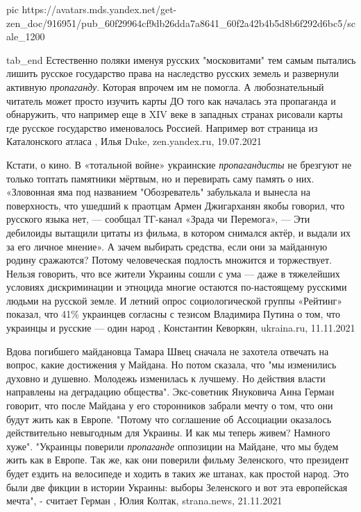     pic https://avatars.mds.yandex.net/get-zen_doc/916951/pub_60f29964cf9db26dda7a8641_60f2a42b4b5d8b6f292d6bc5/scale_1200

  tab_end
\fi
Естественно поляки именуя русских "московитами" тем самым пытались лишить
русское государство права на наследство русских земель и развернули активную
\emph{пропаганду}. Которая впрочем им не помогла.  А любознательный читатель
может просто изучить карты ДО того как началась эта пропаганда и обнаружить,
что например еще в XIV веке в западных странах рисовали карты где русское
государство именовалось Россией. Например вот страница из Каталонского атласа
, Илья Duke, zen.yandex.ru, 19.07.2021

Кстати, о кино. В «тотальной войне» украинские \emph{пропагандисты} не брезгуют
не только топтать памятники мёртвым, но и перевирать саму память о них.
«Зловонная яма под названием "Обозреватель" забулькала и вынесла на
поверхность, что ушедший к праотцам Армен Джигарханян якобы говорил, что
русского языка нет, — сообщал ТГ-канал «Зрада чи Перемога», — Эти дебилоиды
вытащили цитаты из фильма, в котором снимался актёр, и выдали их за его личное
мнение». А зачем выбирать средства, если они за майданную родину сражаются?
Потому человеческая подлость множится и торжествует.  Нельзя говорить, что все
жители Украины сошли с ума — даже в тяжелейших условиях дискриминации и
этноцида многие остаются по-настоящему русскими людьми на русской земле. И
летний опрос социологической группы «Рейтинг» показал, что 41\% украинцев
согласны с тезисом Владимира Путина о том, что украинцы и русские — один народ
, 
Константин Кеворкян, ukraina.ru, 11.11.2021

Вдова погибшего майдановца Тамара Швец сначала не захотела отвечать на вопрос,
какие достижения у Майдана. Но потом сказала, что "мы изменились духовно и
душевно. Молодежь изменилась к лучшему. Но действия власти направлены на
деградацию общества".  Экс-советник Януковича Анна Герман говорит, что после
Майдана у его сторонников забрали мечту о том, что они будут жить как в Европе.
"Потому что соглашение об Ассоциации оказалось действительно невыгодным для
Украины. И как мы теперь живем? Намного хуже".  "Украинцы поверили
\emph{пропаганде} оппозиции на Майдане, что мы будем жить как в Европе. Так же,
как они поверили фильму Зеленского, что президент будет ездить на велосипеде и
ходить в таких же штанах, как простой народ. Это были две фикции в истории
Украины: выборы Зеленского и вот эта европейская мечта", - считает Герман
, 
Юлия Колтак, strana.news, 21.11.2021

